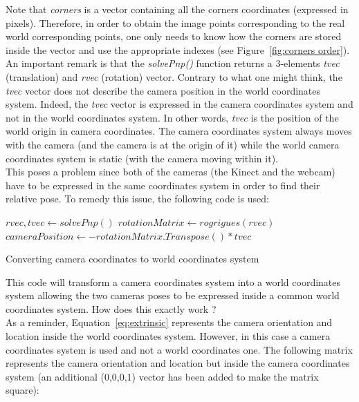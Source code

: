 Note that \textit{corners} is a vector containing all the corners coordinates (expressed in pixels). Therefore, in order to obtain the image points corresponding to the real world corresponding points, one only needs to know how the corners are stored inside the vector and use the appropriate indexes (see Figure~\ref{fig:corners order}). \\

An important remark is that the \textit{solvePnp()} function returns a 3-elements \textit{tvec} (translation) and \textit{rvec} (rotation) vector. Contrary to what one might think, the \textit{tvec} vector does not describe the camera position in the world coordinates system. Indeed, the \textit{tvec} vector is expressed in the camera coordinates system and not in the world coordinates system. In other words, \textit{tvec} is the position of the world origin in camera coordinates. The camera coordinates system always moves with the camera (and the camera is at the origin of it) while the world camera coordinates system is static (with the camera moving within it).\\

This poses a problem since both of the cameras (the Kinect and the webcam) have to be expressed in the same coordinates system in order to find their relative pose. To remedy this issue, the following code is used:\\

\begin{algorithm}[H]
  \begin{algorithmic}
    \State $rvec, tvec\gets solvePnp()$
    \State $rotationMatrix \gets rogrigues(rvec)$
    \State $cameraPosition \gets -rotationMatrix.Transpose() * tvec$ 
  \caption{Converting camera coordinates to world coordinates system}
  \label{algo:pose in world coordinates}
  \end{algorithmic}
\end{algorithm}


This code will transform a camera coordinates system into a world coordinates system allowing the two cameras poses to be expressed inside a common world coordinates system. How does this exactly work ? \\

As a reminder, Equation~\ref{eq:extrinsic} represents the camera orientation and location inside the world coordinates system. However, in this case a camera coordinates system is used and not a world coordinates one. The following matrix represents the camera orientation and location but inside the camera coordinates system (an additional (0,0,0,1) vector has been added to make the matrix square):

